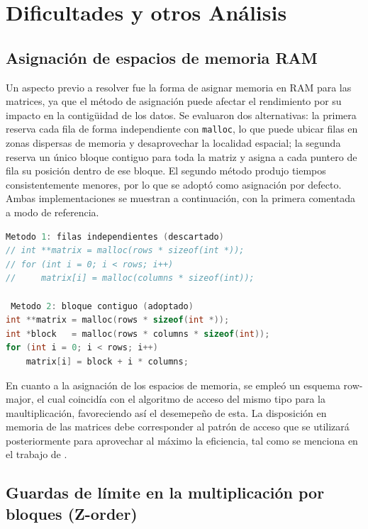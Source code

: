 \documentclass[11pt,a4paper]{article}
\begin{document}
\section{Dificultades y otros Análisis}

\subsection{Asignación de espacios de memoria RAM}
Un aspecto previo a resolver fue la forma de asignar memoria en RAM para las matrices,
ya que el método de asignación puede afectar el rendimiento por su impacto en la
contigüidad de los datos. Se evaluaron dos alternativas: la primera reserva cada fila
de forma independiente con \texttt{malloc}, lo que puede ubicar filas en zonas dispersas
de memoria y desaprovechar la localidad espacial; la segunda reserva un único bloque
contiguo para toda la matriz y asigna a cada puntero de fila su posición dentro de ese
bloque. El segundo método produjo tiempos consistentemente menores, por lo que se adoptó
como asignación por defecto. Ambas implementaciones se muestran a continuación, con la
primera comentada a modo de referencia.


\begin{lstlisting}[language=C]
Metodo 1: filas independientes (descartado)
// int **matrix = malloc(rows * sizeof(int *));
// for (int i = 0; i < rows; i++)
//     matrix[i] = malloc(columns * sizeof(int));
 
 Metodo 2: bloque contiguo (adoptado)
int **matrix = malloc(rows * sizeof(int *));
int *block   = malloc(rows * columns * sizeof(int));
for (int i = 0; i < rows; i++)
    matrix[i] = block + i * columns;
\end{lstlisting}

En cuanto a la asignación de los espacios de memoria, se empleó un esquema row-major, el cual coincidía con el algoritmo de acceso del mismo tipo para la maultiplicación, favoreciendo así el desemepeño de esta. La disposición en memoria de las matrices debe corresponder al patrón de acceso que se utilizará posteriormente para aprovechar al máximo la eficiencia, tal como se menciona en el trabajo de \citet{chatterjee1999recursive}.

\subsection{Guardas de límite en la multiplicación por bloques (Z-order)}
\end{document}
